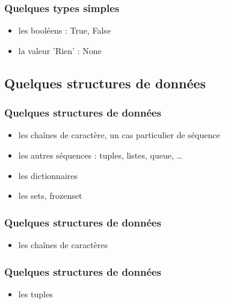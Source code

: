 \begin{frame}
  \frametitle{Quelques types simples}
    \begin{itemize}
      \item les booléens : \alert{True, False}
      \item la valeur 'Rien' : \alert{None}
    \end{itemize}
\end{frame}


\subsection{Quelques structures de données}
\begin{frame}
  \frametitle{Quelques structures de données}
  \begin{itemize}
    \item<1-> les chaînes de caractère, un cas particulier de séquence
    \item<2-> les autres séquences : tuples, listes, queue, \ldots
    \item<3-> les dictionnaires
    \item<4-> les sets, frozenset
  \end{itemize}
\end{frame}

\begin{frame}[fragile]
  \frametitle{Quelques structures de données}
  \begin{itemize}
    \item les chaînes de caractères
  \end{itemize}
  \begin{ipython}
  \end{ipython}
\end{frame}

\begin{frame}[fragile]
  \frametitle{Quelques structures de données}
    \begin{itemize}
      \item les tuples
    \end{itemize}
    \begin{ipython}
    \end{ipython}
\end{frame}

